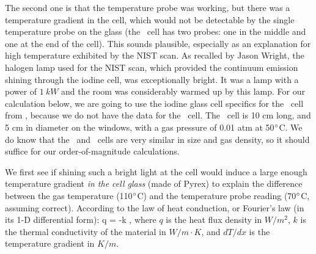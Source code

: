 The second one is that the temperature probe was working, but there
was a temperature gradient in the cell, which would not be detectable
by the single temperature probe on the glass (the \keck\ cell has two
probes: one in the middle and one at the end of the cell). This sounds
plausible, especially as an explanation for high temperature exhibited
by the NIST scan. As recalled by Jason Wright, the halogen lamp used
for the NIST scan, which provided the continuum emission shining
through the iodine cell, was exceptionally bright. It was a lamp with
a power of $1\ kW$ and the room was considerably warmed up by this
lamp. For our calculation below, we are going to use the iodine glass
cell specifics for the \keck\ cell from \cite{butler1996}, because we
do not have the data for the \het\ cell. The \keck\ cell is 10 cm
long, and 5 cm in diameter on the windows, with a gas pressure of 0.01
atm at 50$^{\circ}$C. We do know that the \keck\ and \het\ cells are
very similar in size and gas density, so it should suffice for our
order-of-magnitude calculations.

We first see if shining such a bright light at the cell would induce a
large enough temperature gradient {\it in the cell glass} (made of
Pyrex) to explain the difference between the gas temperature
(110$^{\circ}$C) and the temperature probe reading (70$^{\circ}$C,
assuming correct). According to the law of heat conduction, or
Fourier's law (in its 1-D differential form):
\beq
q = -k ,
\eeq
where $q$ is the heat flux density in $W/m^2$, $k$ is the thermal
conductivity of the material in $W/m \cdot K$, and $dT/dx$ is the
temperature gradient in $K/m$.

